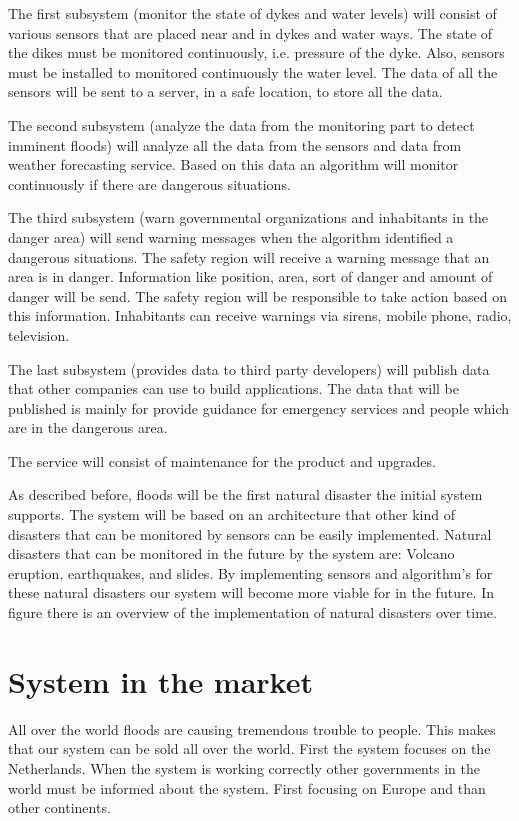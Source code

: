 The first subsystem (monitor the state of dykes and water levels) will consist of various sensors that are placed near and in dykes and water ways. The state of the dikes must be monitored continuously, i.e. pressure of the dyke. Also, sensors must be installed to monitored continuously the water level. The data of all the sensors will be sent to a server, in a safe location, to store all the data.

The second subsystem (analyze the data from the monitoring part to detect imminent floods) will analyze all the data from the sensors and data from weather forecasting service. Based on this data an algorithm will monitor continuously if there are dangerous situations.

The third subsystem (warn governmental organizations and inhabitants in the danger area) will send warning messages when the algorithm identified a dangerous situations. The safety region will receive a warning message that an area is in danger. Information like position, area, sort of danger and amount of danger will be send. The safety region will be responsible to take action based on this information. Inhabitants can receive warnings via sirens, mobile phone, radio, television. %

The last subsystem (provides data to third party developers) will publish data that other companies can use to build applications. The data that will be published is mainly for provide guidance for emergency services and people which are in the dangerous area. 

The service will consist of maintenance for the product and upgrades.

As described before, floods will be the first natural disaster the initial system supports. The system will be based on an architecture that other kind of disasters that can be monitored by sensors can be easily implemented. Natural disasters that can be monitored in the future by the system are: Volcano eruption, earthquakes, and slides. By implementing sensors and algorithm's for these natural disasters our system will become more viable for in the future. In figure 
there is an overview of the implementation of natural disasters over time.

\section{System in the market}
All over the world floods are causing tremendous trouble to people. This makes that our system can be sold all over the world. First the system focuses on the Netherlands. When the system is working correctly other governments in the world must be informed about the system. First focusing on Europe and than other continents.

